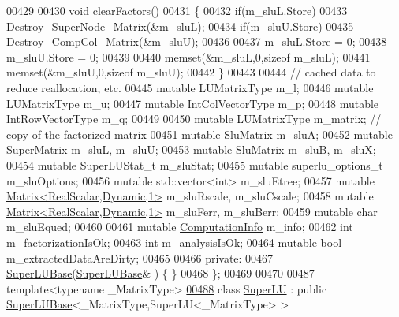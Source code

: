 \begin{DoxyCode}
00429 
00430     \textcolor{keywordtype}{void} clearFactors()
00431     \{
00432       \textcolor{keywordflow}{if}(m\_sluL.Store)
00433         Destroy\_SuperNode\_Matrix(&m\_sluL);
00434       \textcolor{keywordflow}{if}(m\_sluU.Store)
00435         Destroy\_CompCol\_Matrix(&m\_sluU);
00436 
00437       m\_sluL.Store = 0;
00438       m\_sluU.Store = 0;
00439 
00440       memset(&m\_sluL,0,\textcolor{keyword}{sizeof} m\_sluL);
00441       memset(&m\_sluU,0,\textcolor{keyword}{sizeof} m\_sluU);
00442     \}
00443 
00444     \textcolor{comment}{// cached data to reduce reallocation, etc.}
00445     \textcolor{keyword}{mutable} LUMatrixType m\_l;
00446     \textcolor{keyword}{mutable} LUMatrixType m\_u;
00447     \textcolor{keyword}{mutable} IntColVectorType m\_p;
00448     \textcolor{keyword}{mutable} IntRowVectorType m\_q;
00449 
00450     \textcolor{keyword}{mutable} LUMatrixType m\_matrix;  \textcolor{comment}{// copy of the factorized matrix}
00451     \textcolor{keyword}{mutable} \hyperlink{struct_eigen_1_1_slu_matrix}{SluMatrix} m\_sluA;
00452     \textcolor{keyword}{mutable} SuperMatrix m\_sluL, m\_sluU;
00453     \textcolor{keyword}{mutable} \hyperlink{struct_eigen_1_1_slu_matrix}{SluMatrix} m\_sluB, m\_sluX;
00454     \textcolor{keyword}{mutable} SuperLUStat\_t m\_sluStat;
00455     \textcolor{keyword}{mutable} superlu\_options\_t m\_sluOptions;
00456     \textcolor{keyword}{mutable} std::vector<int> m\_sluEtree;
00457     \textcolor{keyword}{mutable} \hyperlink{group___core___module}{Matrix<RealScalar,Dynamic,1>} m\_sluRscale, m\_sluCscale;
00458     \textcolor{keyword}{mutable} \hyperlink{group___core___module}{Matrix<RealScalar,Dynamic,1>} m\_sluFerr, m\_sluBerr;
00459     \textcolor{keyword}{mutable} \textcolor{keywordtype}{char} m\_sluEqued;
00460 
00461     \textcolor{keyword}{mutable} \hyperlink{group__enums_ga85fad7b87587764e5cf6b513a9e0ee5e}{ComputationInfo} m\_info;
00462     \textcolor{keywordtype}{int} m\_factorizationIsOk;
00463     \textcolor{keywordtype}{int} m\_analysisIsOk;
00464     \textcolor{keyword}{mutable} \textcolor{keywordtype}{bool} m\_extractedDataAreDirty;
00465     
00466   \textcolor{keyword}{private}:
00467     \hyperlink{class_eigen_1_1_super_l_u_base}{SuperLUBase}(\hyperlink{class_eigen_1_1_super_l_u_base}{SuperLUBase}& ) \{ \}
00468 \};
00469 
00470 
00487 \textcolor{keyword}{template}<\textcolor{keyword}{typename} \_MatrixType>
\hyperlink{class_eigen_1_1_super_l_u}{00488} \textcolor{keyword}{class }\hyperlink{class_eigen_1_1_super_l_u}{SuperLU} : \textcolor{keyword}{public} \hyperlink{class_eigen_1_1_super_l_u_base}{SuperLUBase}<\_MatrixType,SuperLU<\_MatrixType> >

\end{DoxyCode}
